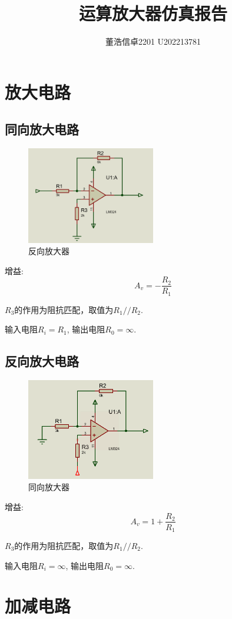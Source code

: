 \documentclass[a4paper,11pt,UTF8]{article}
\title{运算放大器仿真报告}
\author{董浩\quad 信卓2201 \quad U202213781}
\date{}
\begin{document}
\maketitle
\section{放大电路}
\subsection{同向放大电路}
\begin{figure}[H]
	\centering
	\includegraphics[width=0.5\textwidth]{反向放大器}
	\caption{反向放大器}
\end{figure}
增益:
$$A_v = - \frac{R_2}{R_1}$$

$R_3$的作用为阻抗匹配，取值为$R_1//R_2$.

输入电阻$R_i=R_1$, 输出电阻$R_0 = \infty$.
\subsection{反向放大电路}
\begin{figure}[H]
	\centering
	\includegraphics[width=0.5\textwidth]{同向放大器}
	\caption{同向放大器}
\end{figure}
增益:
$$A_v=1+\frac{R_2}{R_1}$$

$R_3$的作用为阻抗匹配，取值为$R_1//R_2$.

输入电阻$R_i=\infty$, 输出电阻$R_0 = \infty$.

\section{加减电路}
\end{document}
